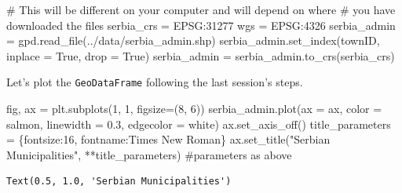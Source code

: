\documentclass[
  letterpaper,
  DIV=11,
  numbers=noendperiod]{scrreprt}
\newenvironment{Shaded}{\begin{snugshade}}{\end{snugshade}}
\newcommand{\CommentTok}[1]{\textcolor[rgb]{0.37,0.37,0.37}{#1}}
\newcommand{\DecValTok}[1]{\textcolor[rgb]{0.68,0.00,0.00}{#1}}
\newcommand{\FloatTok}[1]{\textcolor[rgb]{0.68,0.00,0.00}{#1}}
\newcommand{\NormalTok}[1]{\textcolor[rgb]{0.00,0.23,0.31}{#1}}
\newcommand{\OperatorTok}[1]{\textcolor[rgb]{0.37,0.37,0.37}{#1}}
\newcommand{\StringTok}[1]{\textcolor[rgb]{0.13,0.47,0.30}{#1}}
\newcommand{\VariableTok}[1]{\textcolor[rgb]{0.07,0.07,0.07}{#1}}
\begin{document}
\begin{Shaded}
\begin{Highlighting}[]
\CommentTok{\# This will be different on your computer and will depend on where}
\CommentTok{\# you have downloaded the files}
\NormalTok{serbia\_crs }\OperatorTok{=} \StringTok{\textquotesingle{}EPSG:31277\textquotesingle{}}
\NormalTok{wgs }\OperatorTok{=} \StringTok{\textquotesingle{}EPSG:4326\textquotesingle{}}
\NormalTok{serbia\_admin }\OperatorTok{=}\NormalTok{ gpd.read\_file(}\StringTok{\textquotesingle{}../data/serbia\_admin.shp\textquotesingle{}}\NormalTok{)}
\NormalTok{serbia\_admin.set\_index(}\StringTok{\textquotesingle{}townID\textquotesingle{}}\NormalTok{, inplace }\OperatorTok{=} \VariableTok{True}\NormalTok{, drop }\OperatorTok{=} \VariableTok{True}\NormalTok{)}
\NormalTok{serbia\_admin }\OperatorTok{=}\NormalTok{ serbia\_admin.to\_crs(serbia\_crs)}
\end{Highlighting}
\end{Shaded}

Let's plot the \texttt{GeoDataFrame} following the last session's steps.

\begin{Shaded}
\begin{Highlighting}[]
\NormalTok{fig, ax }\OperatorTok{=}\NormalTok{ plt.subplots(}\DecValTok{1}\NormalTok{, }\DecValTok{1}\NormalTok{, figsize}\OperatorTok{=}\NormalTok{(}\DecValTok{8}\NormalTok{, }\DecValTok{6}\NormalTok{))}
\NormalTok{serbia\_admin.plot(ax }\OperatorTok{=}\NormalTok{ ax, color }\OperatorTok{=} \StringTok{\textquotesingle{}salmon\textquotesingle{}}\NormalTok{, linewidth }\OperatorTok{=} \FloatTok{0.3}\NormalTok{, edgecolor }\OperatorTok{=} \StringTok{\textquotesingle{}white\textquotesingle{}}\NormalTok{)}
\NormalTok{ax.set\_axis\_off()}
\NormalTok{title\_parameters }\OperatorTok{=}\NormalTok{ \{}\StringTok{\textquotesingle{}fontsize\textquotesingle{}}\NormalTok{:}\StringTok{\textquotesingle{}16\textquotesingle{}}\NormalTok{, }\StringTok{\textquotesingle{}fontname\textquotesingle{}}\NormalTok{:}\StringTok{\textquotesingle{}Times New Roman\textquotesingle{}}\NormalTok{\}}
\NormalTok{ax.set\_title(}\StringTok{"Serbian Municipalities"}\NormalTok{, }\OperatorTok{**}\NormalTok{title\_parameters) }\CommentTok{\#parameters as above}
\end{Highlighting}
\end{Shaded}

\begin{verbatim}
Text(0.5, 1.0, 'Serbian Municipalities')
\end{verbatim}
\end{document}
